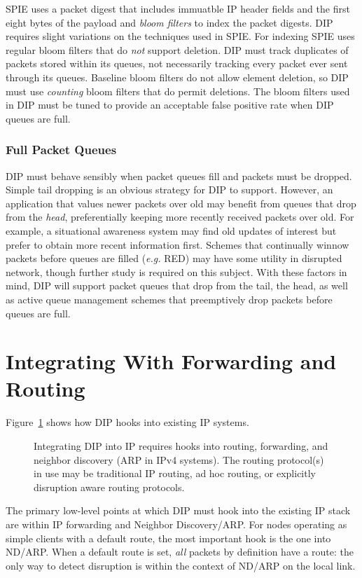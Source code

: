 \documentclass[10pt,letterpaper]{article}
\begin{document}
SPIE uses a packet digest that includes
immuatble IP header fields and the first eight bytes of the payload
and {\em bloom filters}\cite{netbloom} to index the packet digests.
DIP requires slight variations on the techniques used in SPIE. For indexing SPIE
uses regular bloom filters that do {\em not} support deletion.
DIP must track duplicates of packets stored within its queues,
not necessarily tracking every packet ever sent through its queues.
Baseline bloom filters do not allow element deletion, so DIP must
use {\em counting} bloom filters\cite{netbloom} that do permit deletions.
The bloom filters used in DIP must be tuned to provide an acceptable
false positive rate when DIP queues are full.

\subsubsection{Full Packet Queues}
DIP must behave sensibly when packet queues fill and packets
must be dropped. Simple tail dropping is an obvious strategy
for DIP to support. However, an application that values newer
packets over old may benefit from queues that drop from the
{\em head}, preferentially keeping more recently received packets over
old. For example, a situational awareness system may find old
updates of interest but prefer to obtain more recent information first.
Schemes that continually winnow packets before queues are filled
({\em e.g.} RED\cite{red}) may have some utility in disrupted network,
though further study is required on this subject. With these
factors in mind, DIP will support packet queues that drop from the
tail, the head, as well as active queue management schemes that
preemptively drop packets before queues are full.

\section{Integrating With Forwarding and Routing}
Figure~\ref{figure:staticdipdetail} shows how DIP hooks into existing IP 
systems.
\begin{figure}
\centerline{
}
\caption{\footnotesize Integrating DIP into IP requires hooks into routing,
forwarding, and neighbor discovery (ARP in IPv4 systems). The routing
protocol(s) in use may be traditional IP routing, ad hoc routing,
or explicitly disruption aware routing protocols.}

\label{figure:staticdipdetail}
\end{figure}
The primary low-level points at which DIP must hook into the existing IP
stack are within IP forwarding and Neighbor Discovery/ARP. For nodes
operating as simple clients with a default route, the most important
hook is the one into ND/ARP. When a default route is set, {\em all}
packets by definition have a route: the only way to detect disruption
is within the context of ND/ARP on the local link.
\end{document}
